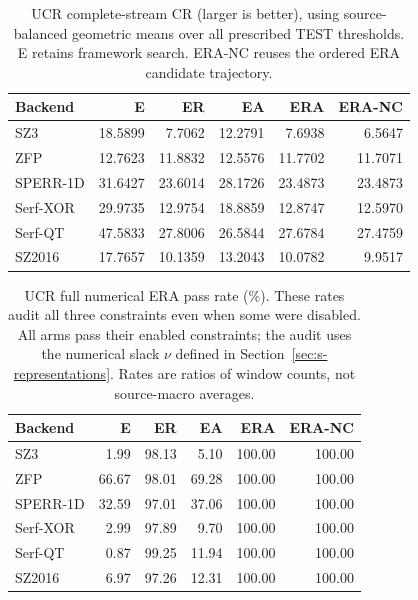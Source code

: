 \begin{table}[t]
\centering
\small
\setlength{\tabcolsep}{5pt}
\caption{UCR complete-stream CR (larger is better), using source-balanced geometric means over all prescribed TEST thresholds. E retains framework search. ERA-NC reuses the ordered ERA candidate trajectory.}
\label{tab:s-ablation-cr-ucr}
\begin{tabular}{@{}lrrrrr@{}}
\toprule
Backend & E & ER & EA & ERA & ERA-NC \\
\midrule
SZ3 & 18.5899 & 7.7062 & 12.2791 & 7.6938 & 6.5647 \\
ZFP & 12.7623 & 11.8832 & 12.5576 & 11.7702 & 11.7071 \\
SPERR-1D & 31.6427 & 23.6014 & 28.1726 & 23.4873 & 23.4873 \\
Serf-XOR & 29.9735 & 12.9754 & 18.8859 & 12.8747 & 12.5970 \\
Serf-QT & 47.5833 & 27.8006 & 26.5844 & 27.6784 & 27.4759 \\
SZ2016 & 17.7657 & 10.1359 & 13.2043 & 10.0782 & 9.9517 \\
\bottomrule
\end{tabular}
\end{table}

\begin{table}[t]
\centering
\small
\setlength{\tabcolsep}{5pt}
\caption{UCR full numerical ERA pass rate (\%). These rates audit all three constraints even when some were disabled. All arms pass their enabled constraints; the audit uses the numerical slack $\nu$ defined in Section~\ref{sec:s-representations}. Rates are ratios of window counts, not source-macro averages.}
\label{tab:s-ablation-pass-ucr}
\begin{tabular}{@{}lrrrrr@{}}
\toprule
Backend & E & ER & EA & ERA & ERA-NC \\
\midrule
SZ3 & 1.99 & 98.13 & 5.10 & 100.00 & 100.00 \\
ZFP & 66.67 & 98.01 & 69.28 & 100.00 & 100.00 \\
SPERR-1D & 32.59 & 97.01 & 37.06 & 100.00 & 100.00 \\
Serf-XOR & 2.99 & 97.89 & 9.70 & 100.00 & 100.00 \\
Serf-QT & 0.87 & 99.25 & 11.94 & 100.00 & 100.00 \\
SZ2016 & 6.97 & 97.26 & 12.31 & 100.00 & 100.00 \\
\bottomrule
\end{tabular}
\end{table}

